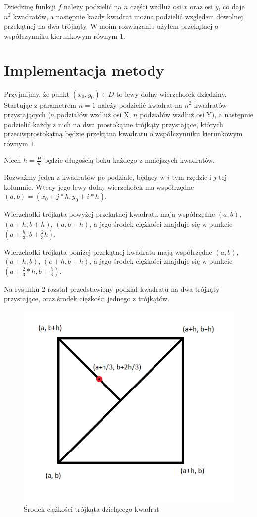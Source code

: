 \documentclass[12pt]{article}
\begin{document}
	Dziedzinę funkcji $f$ należy podzielić na $n$ części wzdłuż osi $x$ oraz osi $y$, co daje $n^2$ kwadratów, a następnie każdy kwadrat można podzielić względem dowolnej przekątnej na dwa trójkąty. W moim rozwiązaniu użyłem przekątnej o współczynniku kierunkowym równym $1$.
	
	\section{Implementacja metody}
	Przyjmijmy, że punkt $(x_0, y_0) \in D$ to lewy dolny wierzchołek dziedziny. Startując z parametrem $n = 1$ należy podzielić kwadrat na $n^2$ kwadratów przystających ($n$ podziałów wzdłuż osi X, $n$ podziałów wzdłuż osi Y), a następnie podzielić każdy z nich na dwa prostokątne trójkąty przystające, których przeciwprostokątną będzie przekątna kwadratu o współczynniku kierunkowym równym $1$.
	
	Niech $h = \frac{H}{n}$ będzie długością boku każdego z mniejszych kwadratów.
	
	Rozważmy jeden z kwadratów po podziale, będący w $i$-tym rzędzie i $j$-tej kolumnie. Wtedy jego lewy dolny wierzchołek ma współrzędne $(a, b) = (x_0 + j*h, y_0 + i*h)$.
	
	Wierzchołki trójkąta powyżej przekątnej kwadratu mają współrzędne $(a, b)$, $(a + h, b + h)$, $(a, b + h)$, a jego środek ciężkości znajduje się w punkcie $(a + \frac{h}{3}, b + \frac{2}{3}h)$.
	
	Wierzchołki trójkąta poniżej przekątnej kwadratu mają współrzędne $(a, b)$, $(a + h, b)$, $(a + h, b + h)$, a jego środek ciężkości znajduje się w punkcie $(a + \frac{2}{3}*h, b + \frac{h}{3})$.
	
	Na rysunku 2 rozstał przedstawiony podział kwadratu na dwa trójkąty przystające, oraz środek ciężkości jednego z trójkątów.
	
	\pagebreak
	
	\begin{figure}
		\includegraphics[scale=1]{images/single-square-gravity-center.png}
		\caption{Środek ciężkości trójkąta dzielącego kwadrat}
	\end{figure}
	
\end{document}
